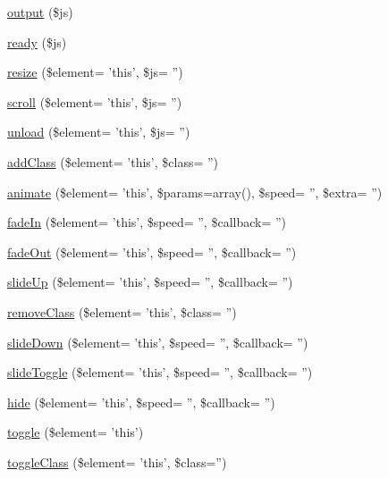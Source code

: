 \begin{DoxyCompactItemize}
\item 
\hyperlink{class_c_i___javascript_a95bc25e9063b14d257e97e4b205073ba}{output} (\$js)
\item 
\hyperlink{class_c_i___javascript_a00997e6137ed7dc0de0159ed143a107b}{ready} (\$js)
\item 
\hyperlink{class_c_i___javascript_a0469e725486d858e32cd09dc0d70e793}{resize} (\$element= 'this', \$js= '')
\item 
\hyperlink{class_c_i___javascript_a97e4228d9140645446f998f61e86af39}{scroll} (\$element= 'this', \$js= '')
\item 
\hyperlink{class_c_i___javascript_ad2978e51b7105fac8b8e4d84ea8ad6b8}{unload} (\$element= 'this', \$js= '')
\item 
\hyperlink{class_c_i___javascript_ac303e5ea1bff16e56b78e0e079c4f093}{add\-Class} (\$element= 'this', \$class= '')
\item 
\hyperlink{class_c_i___javascript_a55cfc996541b0f600762709fc300c5db}{animate} (\$element= 'this', \$params=array(), \$speed= '', \$extra= '')
\item 
\hyperlink{class_c_i___javascript_a6c5bf9d34bbf53e47650a410697a547c}{fade\-In} (\$element= 'this', \$speed= '', \$callback= '')
\item 
\hyperlink{class_c_i___javascript_a4afea7e253d0005b0246c54454af8e08}{fade\-Out} (\$element= 'this', \$speed= '', \$callback= '')
\item 
\hyperlink{class_c_i___javascript_a03921f68a26b4fa42ae74e9539b9f8cb}{slide\-Up} (\$element= 'this', \$speed= '', \$callback= '')
\item 
\hyperlink{class_c_i___javascript_a23b05acfb5f984950d0f87dfcea02511}{remove\-Class} (\$element= 'this', \$class= '')
\item 
\hyperlink{class_c_i___javascript_a77761c7dd96b9fc3ce4f747fb39bea23}{slide\-Down} (\$element= 'this', \$speed= '', \$callback= '')
\item 
\hyperlink{class_c_i___javascript_acd13a8b79a9b4e4ed5e1b9c4f6051ca4}{slide\-Toggle} (\$element= 'this', \$speed= '', \$callback= '')
\item 
\hyperlink{class_c_i___javascript_a1de0e2ddc6b45ec4dc5eafcadfcc0791}{hide} (\$element= 'this', \$speed= '', \$callback= '')
\item 
\hyperlink{class_c_i___javascript_a43a546a5662b09af35c814f3c996a9d6}{toggle} (\$element= 'this')
\item 
\hyperlink{class_c_i___javascript_a3fb1ee904583a1b7532f54632b278e53}{toggle\-Class} (\$element= 'this', \$class='')

\end{DoxyCompactItemize}
